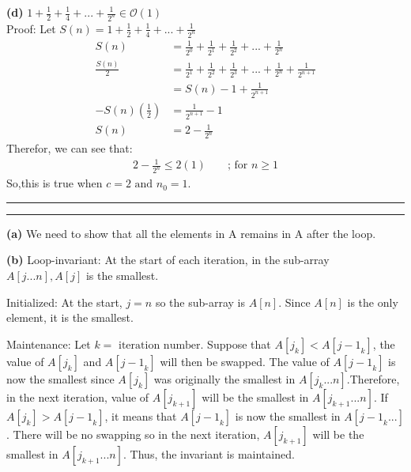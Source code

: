 \documentclass[a4paper, 12pt]{article}
\newcommand{\question}[1] {\vspace{.25in} \hrule\vspace{0.5em}
\noindent{\bf #1} \vspace{0.5em}
\hrule \vspace{.10in}}
\renewcommand{\part}[1] {\vspace{10pt} {\bf (#1)}}
\begin{document}
\part{d}
$1 + \frac12 + \frac{1}{4} + ...+\frac{1}{2^n} \in \mathcal{O}(1)$\\

Proof: Let $S(n) = 1 + \frac12 + \frac{1}{4} + ...+\frac{1}{2^n}$
\begin{align*}
	S(n) &= \frac{1}{2^0} + \frac{1}{2^1} + \frac{1}{2^2} + ... +\frac{1}{2^n}\\
	\frac{S(n)}{2} &= \frac{1}{2^1} + \frac{1}{2^2} + \frac{1}{2^3} +... +\frac{1}{2^n} +\frac{1}{2^{n+1}} \\
	&= S(n) -1 +\frac{1}{2^{n+1}}\\
	-S(n)(\frac{1}{2}) &= \frac{1}{2^{n+1}} -1	\\
	S(n) &= 2 - \frac{1}{2^n}
\end{align*}
Therefor, we can see that:
\begin{align*}
	2 - \frac{1}{2^n} \leqslant 2(1) && \text{ ; for } n \geqslant 1
\end{align*}
So,this is true when $c=2 \text{ and } n_0 = 1$.
\question{Problem 2}

\part{a} We need to show that all the elements in A remains in A after the loop.

\part{b} Loop-invariant: At the start of each iteration, in the sub-array $A[j...n], A[j]$ is the smallest.

Initialized: At the start, $j = n$ so the sub-array is $A[n]$. Since $A[n]$ is the only element, it is the smallest.

Maintenance: Let $k = \text{ iteration number}$. Suppose that $A[j_k] < A[{j-1}_k] $, the value of $A[j_k]$ and $A[{j-1}_k]$ will then be swapped. The value of $A[{j-1}_k]$ is now the smallest since $A[j_k]$ was originally the smallest in $A[j_k...n]$.Therefore, in the next iteration, value of $A[j_{k+1}]$ will be the smallest in $A[j_{k+1}...n]$. If $A[j_k] > A[{j-1}_k] $, it means that $A[{j-1}_k]$ is now the smallest in $A[{j-1}_k...]$. There will be no swapping so in the next iteration, $A[j_{k+1}]$ will be the smallest in $A[j_{k+1}...n]$. Thus, the invariant is maintained.
\end{document}
